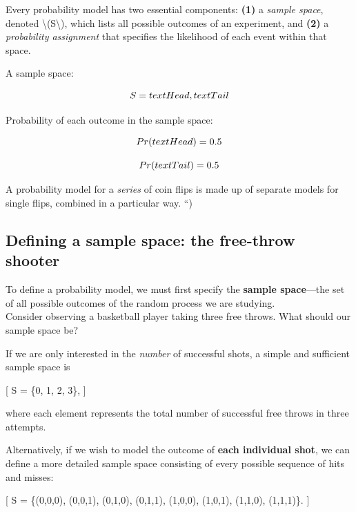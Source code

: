 \documentclass[
  letterpaper,
  DIV=11,
  numbers=noendperiod]{scrreprt}
\begin{document}
Every probability model has two essential components: \textbf{(1)} a
\emph{sample space}, denoted \textbackslash(S\textbackslash), which
lists all possible outcomes of an experiment, and \textbf{(2)} a
\emph{probability assignment} that specifies the likelihood of each
event within that space.

A sample space:

\[
S = \\{\\text{Head},\\ \\text{Tail}\\}
\]

Probability of each outcome in the sample space:

\[
\\Pr(\\text{Head}) = 0.5
\]

\[
\\Pr(\\text{Tail}) = 0.5
\]

A probability model for a \emph{series} of coin flips is made up of
separate models for single flips, combined in a particular way. ``)

\subsection{Defining a sample space: the free-throw
shooter}\label{defining-a-sample-space-the-free-throw-shooter}

To define a probability model, we must first specify the \textbf{sample
space}---the set of all possible outcomes of the random process we are
studying.\\
Consider observing a basketball player taking three free throws. What
should our sample space be?

If we are only interested in the \emph{number} of successful shots, a
simple and sufficient sample space is

{[} S = \{0, 1, 2, 3\}, {]}

where each element represents the total number of successful free throws
in three attempts.

Alternatively, if we wish to model the outcome of \textbf{each
individual shot}, we can define a more detailed sample space consisting
of every possible sequence of hits and misses:

{[} S = \{(0,0,0), (0,0,1), (0,1,0), (0,1,1), (1,0,0), (1,0,1), (1,1,0),
(1,1,1)\}. {]}
\end{document}
